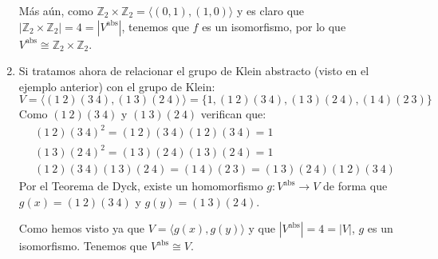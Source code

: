\begin{ejemplo}
\begin{enumerate}
            Más aún, como $\mathbb{Z}_2\times\mathbb{Z}_2 = \langle (0,1),(1,0) \rangle $ y es claro que $|\mathbb{Z}_2\times\mathbb{Z}_2| = 4 = |V^{\text{abs}}|$, tenemos que $f$ es un isomorfismo, por lo que $V^{\text{abs}}\cong \mathbb{Z}_2\times\mathbb{Z}_2$.
        \item Si tratamos ahora de relacionar el grupo de Klein abstracto (visto en el ejemplo anterior) con el grupo de Klein:
            \begin{equation*}
                V = \langle (1\ 2)(3\ 4), (1\ 3)(2\ 4) \rangle  = \{1, (1\ 2)(3\ 4), (1\ 3)(2\ 4), (1\ 4)(2\ 3)\}
            \end{equation*}
            Como $(1\ 2)(3\ 4)$ y $(1\ 3)(2\ 4)$ verifican que:
            \begin{align*}
                &{(1\ 2)(3\ 4)}^{2} = (1\ 2)(3\ 4)(1\ 2)(3\ 4) = 1 \\
                &{(1\ 3)(2\ 4)}^{2} = (1\ 3)(2\ 4)(1\ 3)(2\ 4) = 1 \\
                &(1\ 2)(3\ 4)(1\ 3)(2\ 4) = (1\ 4)(2\ 3) = (1\ 3)(2\ 4)(1\ 2)(3\ 4)
            \end{align*}
            Por el Teorema de Dyck, existe un homomorfismo $g:V^{\text{abs}}\to V$ de forma que $g(x) = (1\ 2)(3\ 4)$ y $g(y) = (1\ 3)(2\ 4)$.

            Como hemos visto ya que $V=\langle g(x), g(y) \rangle $ y que $|V^\text{abs}| = 4 = |V|$, $g$ es un isomorfismo. Tenemos que $V^{\text{abs}}\cong V$.


\end{enumerate}
\end{ejemplo}
